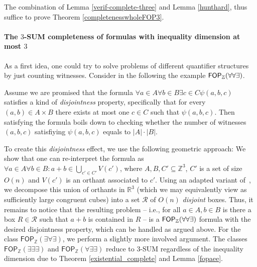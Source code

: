 The combination of Lemma \ref{verif-complete-three} and Lemma \ref{hunthard}, thus suffice to 
prove Theorem \ref{completenesswholeFOP3}.
\paragraph*{The $3$-SUM completeness of formulas with inequality dimension at most $3$}

As a first idea, one could try to solve problems of different quantifier structures
by just counting witnesses. Consider in the following the example $\mathsf{FOP}_{\mathbb{Z}}(\forall \forall \exists)$. 

Assume we are promised that the formula $\forall a\in A \forall b\in B \exists c\in C \psi(a,b,c)$ 
satisfies a kind of \emph{disjointness} property, specifically that for every $(a,b) \in A \times B$ there exists at most one $c \in C$ such that $\psi(a,b,c)$. Then satisfying the formula boils down to checking whether the number of witnesses $(a,b,c)$ satisfiying $\psi(a,b,c)$ equals to $|A|\cdot |B|$.

To create this \emph{disjointness} effect, we use the following geometric approach: 
We show that one can re-interpret the formula as $\forall a\in A \forall b\in B: a+b\in \bigcup_{c'\in C'} V(c')$, where $A,B,C' \subseteq \mathbb{Z}^3$, $C'$ is a set of size $O(n)$ and $V(c')$ is an orthant associated to $c'$. Using an adapted variant of~\cite{DBLP:journals/dcg/ChewDEK99}, we decompose this union of orthants in $\mathbb{R}^3$ (which we may equivalently view as sufficiently large congruent cubes) into a set $\mathcal{R}$ of $O(n)$ \emph{disjoint} boxes. Thus, it remains to notice that the resulting problem  -- i.e., for all $a\in A, b\in B$ is there a box $R\in \mathcal{R}$ such that $a+b$ is contained in $R$ -- is a $\mathsf{FOP}_{\mathbb{Z}}(\forall \forall \exists)$ formula with the desired disjointness property, which can be handled as argued above.  
For the class $\mathsf{FOP}_{\mathbb{Z}}(\exists \forall \exists)$, we perform a slightly more involved argument.
The classes $\mathsf{FOP}_{\mathbb{Z}}(\exists \exists \exists)$ and $ \mathsf{FOP}_{\mathbb{Z}}(\forall \exists \exists)$
reduce to $3$-SUM regardless of the inequality dimension due to Theorem \ref{existential_complete} and Lemma \ref{fopaee}.











